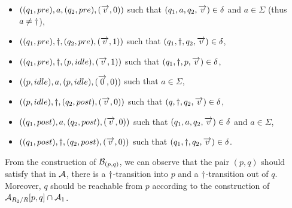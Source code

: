 \begin{itemize}%
\item $((q_1, pre), a, (q_2, pre), (\overrightarrow{v}, 0))$ such that $(q_1, a, q_2, \overrightarrow{v}) \in \delta$ and $a \in \Sigma$ (thus $a \neq \dag$), 
%
\item $((q_1, pre), \dag, (q_2, pre), (\overrightarrow{v}, 1))$ such that $(q_1, \dag, q_2, \overrightarrow{v}) \in \delta$, 
%
\item $((q_1, pre), \dag, (p, idle), (\overrightarrow{v}, 1))$ such that $(q_1, \dag, p, \overrightarrow{v}) \in \delta$,
%
%
%
\item $((p, idle), a, (p, idle), (\overrightarrow{0}, 0))$ such that $a \in \Sigma$, 
\item $((p, idle), \dag, (q_2, post), (\overrightarrow{v}, 0))$ such that $(q, \dag, q_2, \overrightarrow{v}) \in \delta$,
%
\item $((q_1, post), a, (q_2, post), (\overrightarrow{v}, 0))$ such that $(q_1, a, q_2, \overrightarrow{v}) \in \delta$ and $a \in \Sigma$,
%
\item $((q_1, post), \dag, (q_2, post), (\overrightarrow{v}, 0))$ such that $(q_1, \dag, q_2, \overrightarrow{v}) \in \delta$.
\end{itemize}
From the construction of $\mathcal{B}_{(p,q)}$, we can observe that the pair $(p,q)$ should satisfy that in $\mathcal{A}$, there is a $\dag$-transition into $p$ and a $\dag$-transition out of $q$. Moreover, $q$ should be reachable from $p$ according to the  construction of $\mathcal{A}_{R_2/R}[p, q] \cap \mathcal{A}_1$. 

